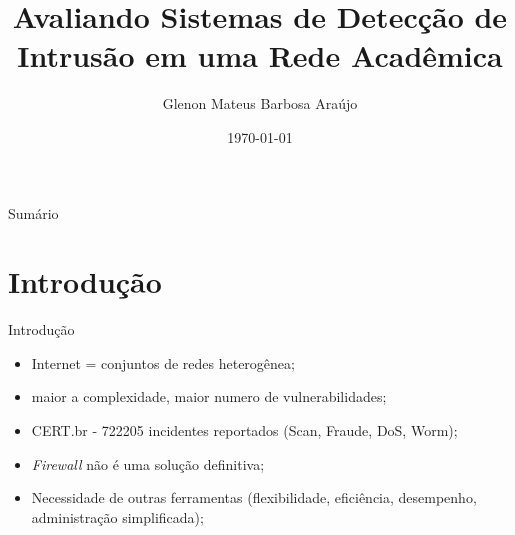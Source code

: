 \documentclass[aspectratio=169]{beamer}
\title{Avaliando Sistemas de Detecção de Intrusão em uma Rede Acadêmica}
\author{Glenon Mateus Barbosa Araújo}
\institute{Trabalho de Conclusão de Curso}
\date{\today}
\begin{document}
\begin{frame}{Sumário}
  \tableofcontents
\end{frame}
\section{Introdução}
\begin{frame}{Introdução}
    \begin{itemize}
        \item Internet = conjuntos de redes heterogênea;
        \item maior a complexidade, maior numero de vulnerabilidades;
        \item CERT.br - 722205 incidentes reportados (Scan, Fraude, DoS, Worm);
        \item \textit{Firewall} não é uma solução definitiva; 
        \item Necessidade de outras ferramentas (flexibilidade, eficiência, desempenho, administração simplificada);
    \end{itemize}
\end{frame}
\end{document}
